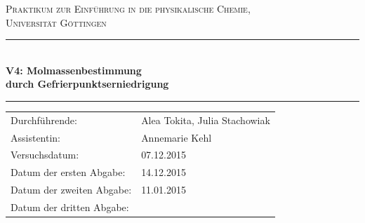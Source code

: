 \documentclass[12pt,a4paper,titlepage,headinclude,bibtotoc]{scrartcl}
\begin{document}
\begin{titlepage}
\centering
\textsc{\Large Praktikum zur Einführung in die physikalische Chemie,\\[1.5ex] Universität Göttingen}

\vspace*{0.5cm}

\rule{\textwidth}{1pt}\\[0.5cm]
{\huge \bfseries
  V4: Molmassenbestimmung\\[1.5ex]
  durch Gefrierpunktserniedrigung}\\[0.5cm]
\rule{\textwidth}{1pt}

\vspace*{0.5cm}


\begin{Large}
\begin{tabular}{ll}
Durchführende: &  Alea Tokita, Julia Stachowiak\\
Assistentin: & Annemarie Kehl\\
 Versuchsdatum: & 07.12.2015\\
 Datum der ersten Abgabe: & 14.12.2015\\
 Datum der zweiten Abgabe: & 11.01.2015 \\
 Datum der dritten Abgabe: &\\
\end{tabular}
\end{Large}

\vspace*{0.5cm}

\begin{Large}
\end{Large}

\end{titlepage}
\end{document}
